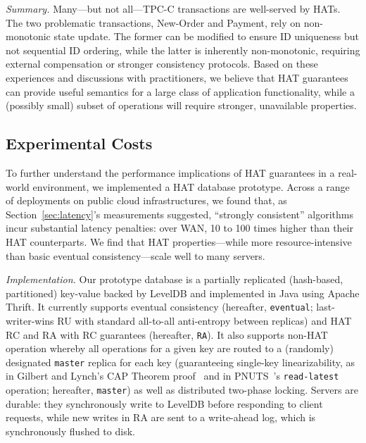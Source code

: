 \vspace{.5em}\noindent\textit{Summary.} Many---but not all---TPC-C
transactions are well-served by HATs. The two problematic
transactions, New-Order and Payment, rely on non-monotonic state
update. The former can be modified to ensure ID uniqueness but not
sequential ID ordering, while the latter is inherently non-monotonic,
requiring external compensation or stronger consistency
protocols. Based on these experiences and discussions with
practitioners, we believe that HAT guarantees can provide useful
semantics for a large class of application functionality, while a
(possibly small) subset of operations will require stronger,
unavailable properties.

\subsection{Experimental Costs}
\label{sec:prototype}

To further understand the performance implications of HAT guarantees
in a real-world environment, we implemented a HAT database
prototype. Across a range of deployments on public cloud
infrastructures, we found that, as Section~\ref{sec:latency}'s
measurements suggested, ``strongly consistent'' algorithms incur
substantial latency penalties: over WAN, 10 to 100 times higher than
their HAT counterparts. We find that HAT
properties---while more resource-intensive than basic eventual
consistency---scale well to many servers.

\vspace{.5em}\noindent\textit{Implementation.} Our prototype database
is a partially replicated (hash-based, partitioned) key-value backed
by LevelDB and implemented in Java using Apache Thrift. It currently
supports eventual consistency (hereafter, \texttt{eventual};
last-writer-wins RU with standard all-to-all anti-entropy between
replicas) and HAT RC and RA with RC guarantees (hereafter,
\texttt{RA}). It also supports non-HAT operation whereby all
operations for a given key are routed to a (randomly) designated
\texttt{master} replica for each key (guaranteeing single-key
linearizability, as in Gilbert and Lynch's CAP Theorem
proof~\cite{gilbert-cap} and in PNUTS~\cite{pnuts}'s
\texttt{read-latest} operation; hereafter, \texttt{master}) as well as
distributed two-phase locking. Servers are durable: they synchronously
write to LevelDB before responding to client requests, while new
writes in RA are sent to a write-ahead log, which is synchronously
flushed to disk.


